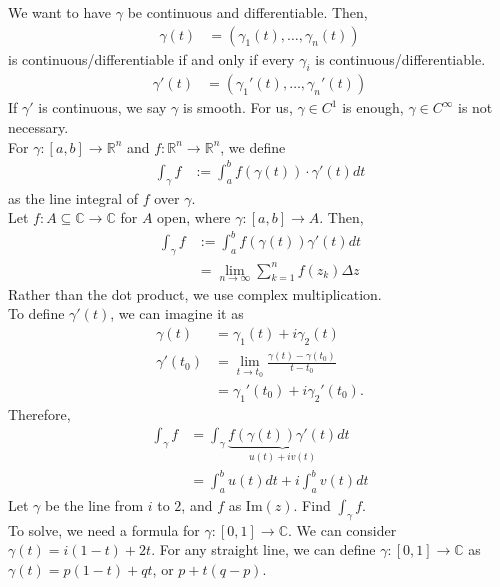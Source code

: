 \documentclass[10pt]{extarticle}
\newcommand{\R}{\mathbb{R}}
\newcommand{\C}{\mathbb{C}}
\begin{document}
  We want to have $\gamma$ be continuous and differentiable. Then,
  \begin{align*}
    \gamma(t) &= (\gamma_1(t),\dots,\gamma_n(t))
  \end{align*}
  is continuous/differentiable if and only if every $\gamma_i$ is continuous/differentiable.
  \begin{align*}
    \gamma'(t) &= (\gamma_1'(t),\dots,\gamma_n'(t))
  \end{align*}
  If $\gamma'$ is continuous, we say $\gamma$ is smooth. For us, $\gamma\in C^{1}$ is enough, $\gamma \in C^{\infty}$ is not necessary.\\

  For $\gamma:[a,b]\rightarrow \R^n$ and $f: \R^n\rightarrow \R^n$, we define
  \begin{align*}
    \int_{\gamma}f &:= \int_{a}^{b}f(\gamma(t))\cdot\gamma'(t)dt
  \end{align*}
  as the line integral of $f$ over $\gamma$.\\

  Let $f: A\subseteq \C\rightarrow \C$ for $A$ open, where $\gamma: [a,b]\rightarrow A$. Then,
  \begin{align*}
    \int_{\gamma}f &:= \int_{a}^{b}f(\gamma(t))\gamma'(t)dt\\
                   &= \lim_{n\rightarrow \infty}\sum_{k=1}^{n}f(z_k)\Delta z
  \end{align*}
  Rather than the dot product, we use complex multiplication.\\

  To define $\gamma'(t)$, we can imagine it as
  \begin{align*}
    \gamma(t) &= \gamma_1(t) + i\gamma_2(t)\\
    \gamma'(t_0) &= \lim_{t\rightarrow t_0}\frac{\gamma(t)-\gamma(t_0)}{t-t_0}\\
                 &= \gamma_1'(t_0) + i\gamma_2'(t_0).
  \end{align*}
  Therefore,
  \begin{align*}
    \int_{\gamma}f &= \int_{\gamma}\underbrace{f(\gamma(t))\gamma'(t)}_{u(t) + iv(t)} dt\\
                   &= \int_{a}^{b}u(t)dt + i\int_{a}^{b}v(t)dt
  \end{align*}
  Let $\gamma$ be the line from $i$ to $2$, and $f$ as $\text{Im}(z)$. Find $\int_{\gamma}f$.\\

  To solve, we need a formula for $\gamma: [0,1]\rightarrow \C$. We can consider $\gamma(t) = i(1-t) + 2t$. For any straight line, we can define $\gamma: [0,1]\rightarrow \C$ as $\gamma(t) = p(1-t) + qt$, or $p + t(q-p)$.\\
\end{document}
